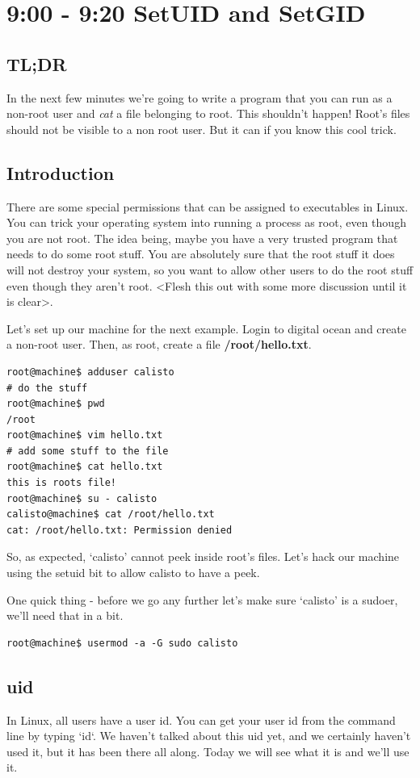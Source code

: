 \documentclass[8pt]{article}
\begin{document}
\section{9:00 - 9:20 SetUID and SetGID}
\subsection{TL;DR}
In the next few minutes we're going to write a program that you can run as a
non-root user and  \textit{cat} a file belonging to root. This shouldn't happen!
Root's files should not be visible to a non root user. But it can if you know
this cool trick. 

\subsection{Introduction}
There are some special permissions that can be assigned to executables in Linux. You can trick your operating system into running a process as root, even though you are not root. The idea being, maybe you have a very trusted program that needs to do some root stuff. You are absolutely sure that the root stuff it does will not destroy your system, so you want to allow other users to do the root stuff even though they aren't root. <Flesh this out with some more discussion until it is clear>. 
  
Let's set up our machine for the next example. Login to digital ocean and create
a non-root user. Then, as root, create a file \textbf{/root/hello.txt}.

\begin{lstlisting}[style=term]
root@machine$ adduser calisto
# do the stuff
root@machine$ pwd
/root
root@machine$ vim hello.txt
# add some stuff to the file
root@machine$ cat hello.txt
this is roots file!
root@machine$ su - calisto
calisto@machine$ cat /root/hello.txt
cat: /root/hello.txt: Permission denied
\end{lstlisting}

So, as expected, `calisto' cannot peek inside root's files. Let's hack our
machine using the setuid bit to allow calisto to have a peek.

One quick thing - before we go any further let's make sure `calisto' is a
sudoer, we'll need that in a bit.

\begin{lstlisting}[style=term]
root@machine$ usermod -a -G sudo calisto
\end{lstlisting}

\subsection{uid}
In Linux, all users have a user id. You can get your user id from the command line by typing `id`. We haven't talked about this uid yet, and we certainly haven't used it, but it has been there all along. Today we will see what it is and we'll use it.
\end{document}
